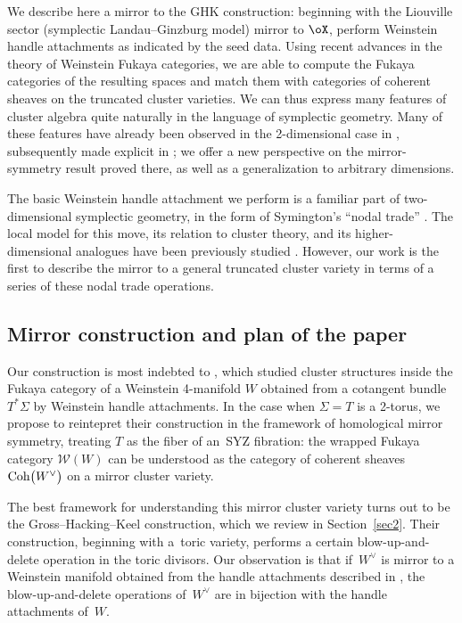 \documentclass[pdftex]{sigma}%
\numberwithin{equation}{section}
\def\cW{\mathcal{W}}
\newcommand{\Coh}{\textup{Coh}}
\begin{document}
We describe here a mirror to the GHK construction: beginning with the Liouville sector (symplectic Landau--Ginzburg model) mirror to $\oX$, perform Weinstein handle attachments as indicated by the seed data. Using recent advances \cite{GPS2,GPS3,GPS1,NS20} in the theory of Weinstein Fukaya categories, we are able to compute the Fukaya categories of the resulting spaces and match them with categories of coherent sheaves on the truncated cluster varieties. We can thus express many features of cluster algebra quite naturally in the language of symplectic geometry. Many of these features have already been observed in the 2-dimensional case in \cite{STW,STWZ}, subsequently made explicit in \cite{HK20}; we offer a new perspective on the mirror-symmetry result proved there, as well as a generalization to arbitrary dimensions.

The basic Weinstein handle attachment we perform is a familiar part of two-dimensional symplectic geometry, in the form
of Symington's ``nodal trade'' \cite{Sym}. The local model for this move, its relation to cluster theory, and its higher-dimensional analogues have been previously studied \cite{Nad-mut,PT,Vianna}. However, our work is the first to describe the mirror to a general truncated cluster variety in terms of a series of these nodal trade operations.

\subsection{Mirror construction and plan of the paper}
Our construction is most indebted to \cite{STW}, which studied cluster structures inside the Fukaya category of a Weinstein 4-manifold $W$ obtained from a cotangent bundle $T^*\Sigma$ by Weinstein handle attachments. In the case when $\Sigma = T$ is a 2-torus, we propose to reintepret their construction in the framework of homological mirror symmetry, treating $T$ as the fiber of an~SYZ fibration: the wrapped Fukaya category $\cW(W)$ can be understood as the category of coherent sheaves $\Coh\big(W^\vee\big)$ on a mirror cluster variety.

The best framework for understanding this mirror cluster variety turns out to be the Gross--Hacking--Keel construction, which we review in Section~\ref{sec2}. Their construction, beginning with a~toric variety, performs a certain blow-up-and-delete operation in the toric divisors.
Our obser\-va\-tion is that if~$W^\vee$ is mirror to a Weinstein manifold obtained from the handle attachments described in \cite{STW}, the blow-up-and-delete operations of~$W^\vee$ are in bijection with the handle attachments of~$W$.
\end{document}
